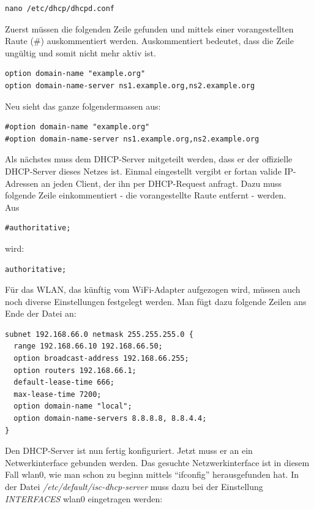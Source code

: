 \begin{lstlisting}
nano /etc/dhcp/dhcpd.conf
\end{lstlisting}

Zuerst müssen die folgenden Zeile gefunden und mittels einer vorangestellten Raute (\#) auskommentiert werden. Auskommentiert bedeutet, dass die Zeile ungültig und somit nicht mehr aktiv ist.

\begin{lstlisting}
option domain-name "example.org"
option domain-name-server ns1.example.org,ns2.example.org
\end{lstlisting}

Neu sieht das ganze folgendermassen aus:

\begin{lstlisting}
#option domain-name "example.org"
#option domain-name-server ns1.example.org,ns2.example.org
\end{lstlisting}

Als nächstes muss dem DHCP-Server mitgeteilt werden, dass er der offizielle DHCP-Server dieses Netzes ist. Einmal eingestellt vergibt er fortan valide IP-Adressen an jeden Client, der ihn per DHCP-Request anfragt.
Dazu muss folgende Zeile einkommentiert - die vorangestellte Raute entfernt - werden.
\\
Aus

\begin{lstlisting}
#authoritative;
\end{lstlisting}

wird:

\begin{lstlisting}
authoritative;
\end{lstlisting}

Für das WLAN, das künftig vom WiFi-Adapter aufgezogen wird, müssen auch noch diverse Einstellungen festgelegt werden.
Man fügt dazu folgende Zeilen ans Ende der Datei an:

\begin{lstlisting}
subnet 192.168.66.0 netmask 255.255.255.0 {
  range 192.168.66.10 192.168.66.50;
  option broadcast-address 192.168.66.255;
  option routers 192.168.66.1;
  default-lease-time 666;
  max-lease-time 7200;
  option domain-name "local";
  option domain-name-servers 8.8.8.8, 8.8.4.4;
}
\end{lstlisting}

Den DHCP-Server ist nun fertig konfiguriert. Jetzt muss er an ein Netwerkinterface gebunden werden. Das gesuchte Netzwerkinterface ist in diesem Fall wlan0, wie man schon zu beginn mittels ``ifconfig'' herausgefunden hat.
In der Datei \textit{/etc/default/isc-dhcp-server} muss dazu bei der Einstellung \textit{INTERFACES} wlan0 eingetragen werden:


